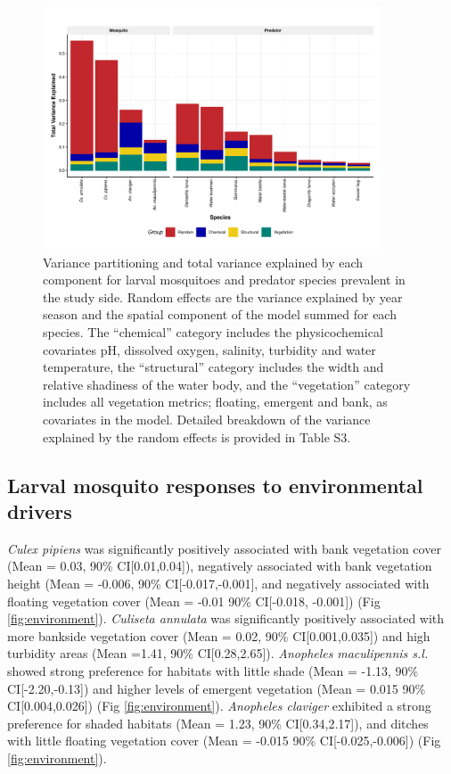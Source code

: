 \documentclass[lineno,sn-basic]{sn-jnl}%
\begin{document}
\begin{figure}[h!htbp]
\centering
\includegraphics[width=0.9\textwidth]{VP.pdf}
\caption{Variance partitioning and total variance explained by each component for larval mosquitoes and predator species prevalent in the study side. Random effects are the variance explained by year season and the spatial component of the model summed for each species. The “chemical” category includes the physicochemical covariates pH, dissolved oxygen, salinity, turbidity and water temperature, the “structural” category includes the width and relative shadiness of the water body, and the “vegetation” category includes all vegetation metrics; floating, emergent and bank, as covariates in the model. Detailed breakdown of the variance explained by the random effects is provided in Table S3.} \label{fig:variance}
\end{figure}

\subsection{Larval mosquito responses to environmental drivers}

\textit{Culex pipiens} was significantly positively associated with bank vegetation cover (Mean = 0.03, 90\% CI[0.01,0.04]), negatively associated with bank vegetation height (Mean = -0.006, 90\% CI[-0.017,-0.001], and negatively associated with floating vegetation cover (Mean = -0.01 90\% CI[-0.018, -0.001]) (Fig \ref{fig:environment}). \textit{Culiseta annulata} was significantly positively associated with more bankside vegetation cover (Mean = 0.02, 90\% CI[0.001,0.035]) and high turbidity areas (Mean =1.41, 90\% CI[0.28,2.65]). \textit{Anopheles }\textit{maculipennis s.l.} showed strong preference for habitats with little shade (Mean = -1.13, 90\% CI[-2.20,-0.13]) and higher levels of emergent vegetation (Mean = 0.015 90\% CI[0.004,0.026]) (Fig \ref{fig:environment}).\textit{ Anopheles claviger }exhibited a strong preference for shaded habitats (Mean = 1.23, 90\% CI[0.34,2.17]), and ditches with little floating vegetation cover (Mean = -0.015 90\% CI[-0.025,-0.006]) (Fig \ref{fig:environment}).
\end{document}
